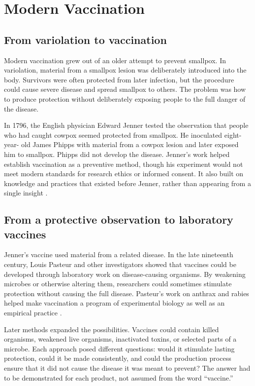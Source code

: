 \documentclass[12pt,oneside]{book}
\begin{document}
\chapter[Modern Vaccination]{Modern Vaccination}

\section{From variolation to vaccination}
Modern vaccination grew out of an older attempt to prevent smallpox. In
variolation, material from a smallpox lesion was deliberately introduced into
the body. Survivors were often protected from later infection, but the
procedure could cause severe disease and spread smallpox to others. The
problem was how to produce protection without deliberately exposing people to
the full danger of the disease.

In 1796, the English physician Edward Jenner tested the observation that people
who had caught cowpox seemed protected from smallpox. He inoculated eight-year-
old James Phipps with material from a cowpox lesion and later exposed him to
smallpox. Phipps did not develop the disease. Jenner's work helped establish
vaccination as a preventive method, though his experiment would not meet
modern standards for research ethics or informed consent. It also built on
knowledge and practices that existed before Jenner, rather than appearing from
a single insight \cite{cdcSmallpoxHistory}.

\section{From a protective observation to laboratory vaccines}
Jenner's vaccine used material from a related disease. In the late nineteenth
century, Louis Pasteur and other investigators showed that vaccines could be
developed through laboratory work on disease-causing organisms. By weakening
microbes or otherwise altering them, researchers could sometimes stimulate
protection without causing the full disease. Pasteur's work on anthrax and
rabies helped make vaccination a program of experimental biology as well as
an empirical practice \cite{sciencehistorypasteur}.

Later methods expanded the possibilities. Vaccines could contain killed
organisms, weakened live organisms, inactivated toxins, or selected parts of a
microbe. Each approach posed different questions: would it stimulate lasting
protection, could it be made consistently, and could the production process
ensure that it did not cause the disease it was meant to prevent? The answer
had to be demonstrated for each product, not assumed from the word
``vaccine.''
\end{document}
